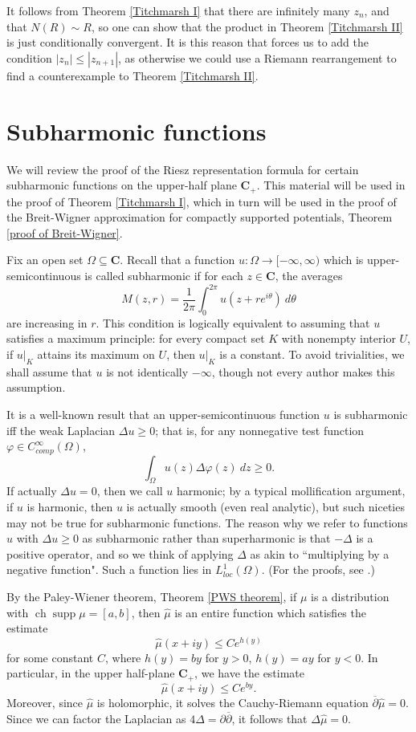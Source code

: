 \documentclass[12pt]{report}
\newcommand{\CC}{\mathbf{C}}
\DeclareMathOperator{\ch}{ch}
\DeclareMathOperator{\supp}{supp}
\newcommand{\dbar}{\overline \partial}
\theoremstyle{definition}
\begin{document}
    It follows from Theorem \ref{Titchmarsh I} that there are infinitely many $z_n$, and that $N(R) \sim R$, so one can show that the product in Theorem \ref{Titchmarsh II} is just conditionally convergent. It is this reason that forces us to add the condition $|z_n| \leq |z_{n+1}|$, as otherwise we could use a Riemann rearrangement to find a counterexample to Theorem \ref{Titchmarsh II}.

\section{Subharmonic functions}
\label{subharmonic functions}
We will review the proof of the Riesz representation formula for certain subharmonic functions on the upper-half plane $\CC_+$.
This material will be used in the proof of Theorem \ref{Titchmarsh I}, which in turn will be used in the proof of the Breit-Wigner approximation for compactly supported potentials, Theorem \ref{proof of Breit-Wigner}.

Fix an open set $\Omega \subseteq \CC$. Recall that a function $u: \Omega \to [-\infty, \infty)$ which is upper-semicontinuous is called subharmonic if for each $z \in \CC$, the averages
$$M(z, r) = \frac{1}{2\pi} \int_0^{2\pi} u(z + re^{i\theta}) ~d\theta$$
are increasing in $r$. This condition is logically equivalent to assuming that $u$ satisfies a maximum principle: for every compact set $K$ with nonempty interior $U$, if $u|_K$ attains its maximum on $U$, then $u|_K$ is a constant. To avoid trivialities, we shall assume that $u$ is not identically $-\infty$, though not every author makes this assumption.

It is a well-known result that an upper-semicontinuous function $u$ is subharmonic iff the weak Laplacian $\Delta u \geq 0$; that is, for any nonnegative test function $\varphi \in C^\infty_{comp}(\Omega)$,
$$\int_\Omega u(z) \Delta \varphi(z) ~dz \geq 0.$$ If actually $\Delta u = 0$, then we call $u$ harmonic; by a typical mollification argument, if $u$ is harmonic, then $u$ is actually smooth (even real analytic), but such niceties may not be true for subharmonic functions. The reason why we refer to functions $u$ with $\Delta u \geq 0$ as subharmonic rather than superharmonic is that $-\Delta$ is a positive operator, and so we think of applying $\Delta$ as akin to ``multiplying by a negative function". Such a function lies in $L^1_{loc}(\Omega)$. (For the proofs, see \cite[Chapter 1]{hormander1973introduction}.)

By the Paley-Wiener theorem, Theorem \ref{PWS theorem}, if $\mu$ is a distribution with $\ch \supp \mu = [a, b]$, then $\hat \mu$ is an entire function which satisfies the estimate
$$\hat \mu(x + iy) \leq Ce^{h(y)}$$
for some constant $C$, where $h(y) = by$ for $y > 0$, $h(y) = ay$ for $y < 0$. In particular, in the upper half-plane $\CC_+$, we have the estimate
$$\hat \mu(x + iy) \leq Ce^{by}.$$
Moreover, since $\hat \mu$ is holomorphic, it solves the Cauchy-Riemann equation $\dbar \hat \mu = 0$. Since we can factor the Laplacian as $4\Delta = \partial \dbar$, it follows that $\Delta \hat \mu = 0$.
\end{document}
